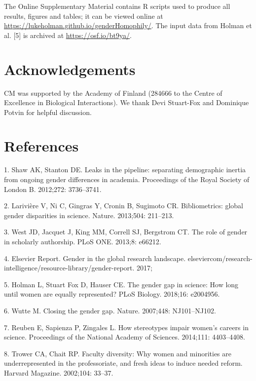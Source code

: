 \documentclass[12pt,]{article}
\begin{document}
The Online Supplementary Material contains R scripts used to produce all
results, figures and tables; it can be viewed online at
\url{https://lukeholman.github.io/genderHomophily/}. The input data from
Holman et al. {[}5{]} is archived at \url{https://osf.io/bt9ya/}.

\section{Acknowledgements}\label{acknowledgements}

CM was supported by the Academy of Finland (284666 to the Centre of
Excellence in Biological Interactions). We thank Devi Stuart-Fox and
Dominique Potvin for helpful discussion.

\section{References}\label{references}

\hypertarget{refs}{}
\hypertarget{ref-Shaw_2012}{}
1. Shaw AK, Stanton DE. Leaks in the pipeline: separating demographic
inertia from ongoing gender differences in academia. Proceedings of the
Royal Society of London B. 2012;272: 3736--3741.

\hypertarget{ref-Lariviere_2013}{}
2. Larivière V, Ni C, Gingras Y, Cronin B, Sugimoto CR. Bibliometrics:
global gender disparities in science. Nature. 2013;504: 211--213.

\hypertarget{ref-West_2013}{}
3. West JD, Jacquet J, King MM, Correll SJ, Bergstrom CT. The role of
gender in scholarly authorship. PLoS ONE. 2013;8: e66212.

\hypertarget{ref-Elsevier_report}{}
4. Elsevier Report. Gender in the global research landscape.
elseviercom/research-intelligence/resource-library/gender-report. 2017;

\hypertarget{ref-Holman_2018}{}
5. Holman L, Stuart Fox D, Hauser CE. The gender gap in science: How
long until women are equally represented? PLoS Biology. 2018;16:
e2004956.

\hypertarget{ref-Wutte_2007}{}
6. Wutte M. Closing the gender gap. Nature. 2007;448: NJ101--NJ102.

\hypertarget{ref-Reuben_2014}{}
7. Reuben E, Sapienza P, Zingales L. How stereotypes impair women's
careers in science. Proceedings of the National Academy of Sciences.
2014;111: 4403--4408.

\hypertarget{ref-Trower_2002}{}
8. Trower CA, Chait RP. Faculty diversity: Why women and minorities are
underrepresented in the professoriate, and fresh ideas to induce needed
reform. Harvard Magazine. 2002;104: 33--37.
\end{document}
